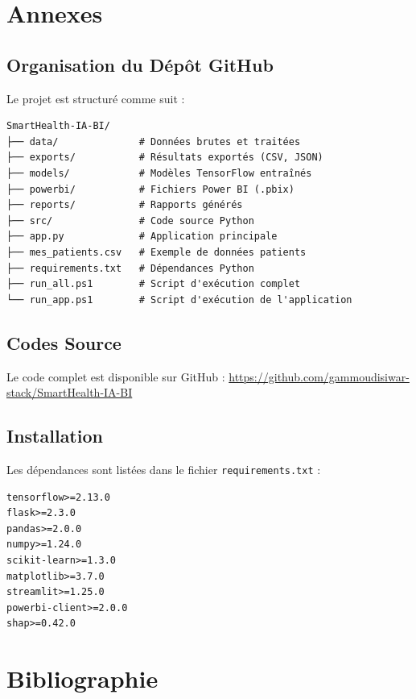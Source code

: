 \documentclass[12pt,a4paper]{article}
\begin{document}
\newpage
\appendix
\section{Annexes}

\subsection{Organisation du Dépôt GitHub}
Le projet est structuré comme suit :
\begin{verbatim}
SmartHealth-IA-BI/
├── data/              # Données brutes et traitées
├── exports/           # Résultats exportés (CSV, JSON)
├── models/            # Modèles TensorFlow entraînés
├── powerbi/           # Fichiers Power BI (.pbix)
├── reports/           # Rapports générés
├── src/               # Code source Python
├── app.py             # Application principale
├── mes_patients.csv   # Exemple de données patients
├── requirements.txt   # Dépendances Python
├── run_all.ps1        # Script d'exécution complet
└── run_app.ps1        # Script d'exécution de l'application
\end{verbatim}

\subsection{Codes Source}
Le code complet est disponible sur GitHub :
\url{https://github.com/gammoudisiwar-stack/SmartHealth-IA-BI}

\subsection{Installation}
Les dépendances sont listées dans le fichier \texttt{requirements.txt} :
\begin{verbatim}
tensorflow>=2.13.0
flask>=2.3.0
pandas>=2.0.0
numpy>=1.24.0
scikit-learn>=1.3.0
matplotlib>=3.7.0
streamlit>=1.25.0
powerbi-client>=2.0.0
shap>=0.42.0
\end{verbatim}

\newpage
\section*{Bibliographie}
\end{document}
